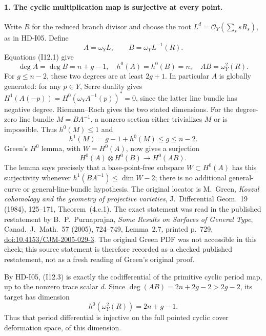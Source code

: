 \paragraph{1. The cyclic multiplication map is surjective at every point.}
Write $R$ for the reduced branch divisor and choose the root
$L^d=\mathcal O_Y(\sum_s sR_s)$, as in HD-I05.  Define
\[
 A=\omega_Y L,\qquad B=\omega_Y L^{-1}(R).
\]
Equations (I12.1) give
\[
 \deg A=\deg B=n+g-1,\quad h^0(A)=h^0(B)=n,
 \quad AB=\omega_Y^2(R).
\]
For $g\leq n-2$, these two degrees are at least $2g+1$.  In particular
$A$ is globally generated: for any $p\in Y$, Serre duality gives
$H^1(A(-p))=H^0(\omega_Y A^{-1}(p))^*=0$, since the latter line bundle
has negative degree.  Riemann--Roch gives the two stated dimensions.
For the degree-zero line bundle $M=BA^{-1}$, a nonzero section either
trivializes $M$ or is impossible.  Thus $h^0(M)\leq1$ and
\[
 h^1(M)=g-1+h^0(M)\leq g\leq n-2.
\]
Green's $H^0$ lemma, with $W=H^0(A)$, now gives a surjection
\begin{equation}
 H^0(A)\otimes H^0(B)\longrightarrow H^0(AB).
 \tag{I12.3}
\end{equation}
The lemma says precisely that a base-point-free subspace
$W\subset H^0(A)$ has this surjectivity whenever
$h^1(BA^{-1})\leq\dim W-2$; there is no additional general-curve or
general-line-bundle hypothesis.  The original locator is M.~Green,
\emph{Koszul cohomology and the geometry of projective varieties},
J.~Differential Geom.~19 (1984), 125--171, Theorem~(4.e.1).
The exact statement was read in the published restatement by
B.~P.~Purnaprajna, \emph{Some Results on Surfaces of General Type},
Canad.~J.~Math.~57 (2005), 724--749, Lemma~2.7, printed p.~729,
\href{https://doi.org/10.4153/CJM-2005-029-3}{doi:10.4153/CJM-2005-029-3}.
The original Green PDF was not accessible in this check; this source
statement is therefore recorded as a checked published restatement,
not as a fresh reading of Green's original proof.

By HD-I05, (I12.3) is exactly the codifferential of the primitive cyclic
period map, up to the nonzero trace scalar $d$.  Since
$\deg(AB)=2n+2g-2>2g-2$, its target has dimension
\[
 h^0(\omega_Y^2(R))=2n+g-1.
\]
Thus that period differential is injective on the full pointed cyclic
cover deformation space, of this dimension.

